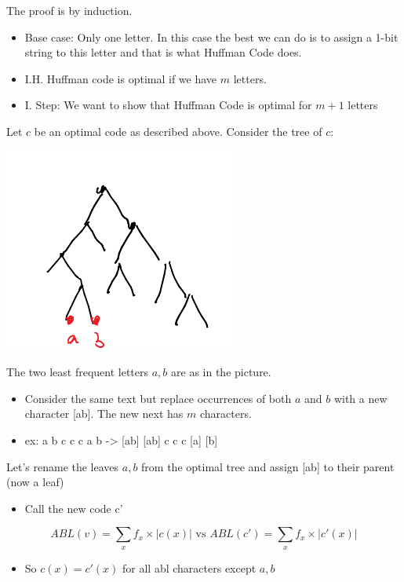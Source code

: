 \documentclass[11pt]{article}
\begin{document}
The proof is by induction.
\begin{itemize}
\item Base case: Only one letter. In this case the best we can do is to assign a 1-bit string to this letter and that is what Huffman Code does.
\item I.H. Huffman code is optimal if we have \uline{\(m\)} letters.
\item I. Step: We want to show that Huffman Code is optimal for \(m+1\) letters
\end{itemize}
Let \(c\) be an optimal code as described above. Consider the tree of \(c\):
\begin{center}
\includegraphics[width=.9\linewidth]{./Images/i67.png}
\end{center}
The two least frequent letters \(a,b\) are as in the picture.
\begin{itemize}
\item Consider the same text but replace occurrences of both \(a\) and \(b\) with a new character [ab]. The new next has \(m\) characters.
\item ex: a b c c c a b -> [ab] [ab] c c c [a] [b]
\end{itemize}
Let's rename the leaves \(a,b\) from the optimal tree and assign [ab] to their parent (now a leaf)
\begin{itemize}
\item Call the new code c'
\end{itemize}
$$ABL(v)=\sum_x f_x \times |c(x)| \text{ vs }ABL(c')=\sum_x f_x \times |c'(x)|$$
\begin{itemize}
\item So \(c(x)=c'(x)\) for all abl characters except \(a,b\)
\end{itemize}
\end{document}
